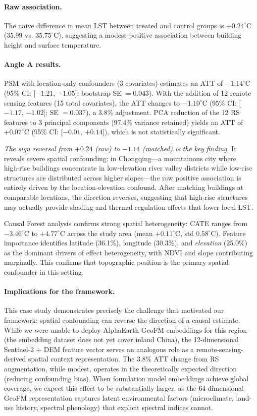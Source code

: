 \documentclass{article}
\begin{document}
\paragraph{Raw association.} The naive difference in mean LST between treated and control groups is $+0.24^\circ$C ($35.99$ vs. $35.75^\circ$C), suggesting a modest positive association between building height and surface temperature.

\paragraph{Angle A results.} PSM with location-only confounders (3 covariates) estimates an ATT of $-1.14^\circ$C (95\% CI: [$-1.21$, $-1.05$]; bootstrap SE $= 0.043$). With the addition of 12 remote sensing features (15 total covariates), the ATT changes to $-1.10^\circ$C (95\% CI: [$-1.17$, $-1.02$]; SE $= 0.037$), a 3.8\% adjustment. PCA reduction of the 12 RS features to 3 principal components (97.4\% variance retained) yields an ATT of $+0.07^\circ$C (95\% CI: [$-0.01$, $+0.14$]), which is not statistically significant.

\textit{The sign reversal from $+0.24$ (raw) to $-1.14$ (matched) is the key finding.} It reveals severe spatial confounding: in Chongqing---a mountainous city where high-rise buildings concentrate in low-elevation river valley districts while low-rise structures are distributed across higher slopes---the raw positive association is entirely driven by the location-elevation confound. After matching buildings at comparable locations, the direction reverses, suggesting that high-rise structures may actually provide shading and thermal regulation effects that lower local LST.

Causal Forest analysis confirms strong spatial heterogeneity: CATE ranges from $-3.46^\circ$C to $+4.77^\circ$C across the study area (mean $+0.11^\circ$C, std $0.58^\circ$C). Feature importance identifies latitude (36.1\%), longitude (30.3\%), and \textit{elevation} (25.0\%) as the dominant drivers of effect heterogeneity, with NDVI and slope contributing marginally. This confirms that topographic position is the primary spatial confounder in this setting.

\paragraph{Implications for the framework.} This case study demonstrates precisely the challenge that motivated our framework: spatial confounding can reverse the direction of a causal estimate. While we were unable to deploy AlphaEarth GeoFM embeddings for this region (the embedding dataset does not yet cover inland China), the 12-dimensional Sentinel-2 + DEM feature vector serves an analogous role as a remote-sensing-derived spatial context representation. The 3.8\% ATT change from RS augmentation, while modest, operates in the theoretically expected direction (reducing confounding bias). When foundation model embeddings achieve global coverage, we expect this effect to be substantially larger, as the 64-dimensional GeoFM representation captures latent environmental factors (microclimate, land-use history, spectral phenology) that explicit spectral indices cannot.
\end{document}
